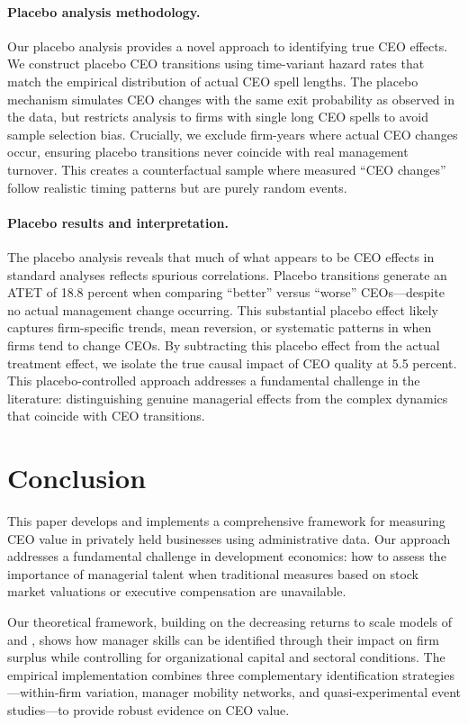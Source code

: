\documentclass[11pt,a4paper]{article}
\begin{document}
\paragraph{Placebo analysis methodology.} Our placebo analysis provides a novel approach to identifying true CEO effects. We construct placebo CEO transitions using time-variant hazard rates that match the empirical distribution of actual CEO spell lengths. The placebo mechanism simulates CEO changes with the same exit probability as observed in the data, but restricts analysis to firms with single long CEO spells to avoid sample selection bias. Crucially, we exclude firm-years where actual CEO changes occur, ensuring placebo transitions never coincide with real management turnover. This creates a counterfactual sample where measured ``CEO changes'' follow realistic timing patterns but are purely random events.

\paragraph{Placebo results and interpretation.} The placebo analysis reveals that much of what appears to be CEO effects in standard analyses reflects spurious correlations. Placebo transitions generate an ATET of 18.8 percent when comparing ``better'' versus ``worse'' CEOs---despite no actual management change occurring. This substantial placebo effect likely captures firm-specific trends, mean reversion, or systematic patterns in when firms tend to change CEOs. By subtracting this placebo effect from the actual treatment effect, we isolate the true causal impact of CEO quality at 5.5 percent. This placebo-controlled approach addresses a fundamental challenge in the literature: distinguishing genuine managerial effects from the complex dynamics that coincide with CEO transitions. 

\section{Conclusion}

This paper develops and implements a comprehensive framework for measuring CEO value in privately held businesses using administrative data. Our approach addresses a fundamental challenge in development economics: how to assess the importance of managerial talent when traditional measures based on stock market valuations or executive compensation are unavailable.

Our theoretical framework, building on the decreasing returns to scale models of \citet{AtkesonKehoe2005JPE} and \citet{McGrattan2012RED}, shows how manager skills can be identified through their impact on firm surplus while controlling for organizational capital and sectoral conditions. The empirical implementation combines three complementary identification strategies---within-firm variation, manager mobility networks, and quasi-experimental event studies---to provide robust evidence on CEO value.
\end{document}
